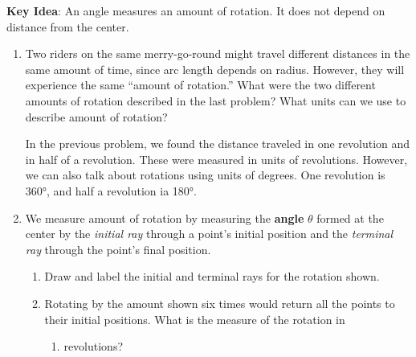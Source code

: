\documentclass[main]{subfiles}
\begin{document}
\pspace{\newpage}

\textbf{Key Idea}: An angle measures an amount of rotation. It does not depend on distance from the center.

\begin{enumerate}[resume]
    \item 
    \begin{problem}
    Two riders on the same merry-go-round might travel different distances in the same amount of time, since arc length depends on radius. However, they will experience the same ``amount of rotation.'' What were the two different amounts of rotation described in the last problem? What units can we use to describe amount of rotation?
    \end{problem}
    \pspace{\vfill}

    \begin{solution}
        In the previous problem, we found the distance traveled in one revolution and in half of a revolution. These were measured in units of revolutions. However, we can also talk about rotations using units of degrees. One revolution is \ang{360}, and half a revolution ia \ang{180}.
    \end{solution}

    \item 
    We measure amount of rotation by measuring the \textbf{angle} $\theta$ formed at the center by the \emph{initial ray} through a point's initial position and the \emph{terminal ray} through the point's final position.

\begin{minipage}[t]{4.3in}\vspace{0pt}
\begin{enumerate}[nosep]
    \item 
    \begin{problem}
    Draw and label the initial and terminal rays for the rotation shown.
    \end{problem}
    
    \item
    \begin{problem}
    Rotating by the amount shown six times would return all the points to their initial positions. What is the measure of the rotation in
    \end{problem}
    \begin{enumerate}
        \item 
        \begin{problem}
            revolutions?
        \end{problem}
        \pspace{24pt}


\end{enumerate}
\end{enumerate}
\end{minipage}
\end{enumerate}
\end{document}
